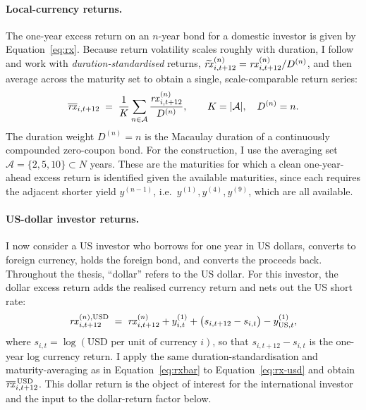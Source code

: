 \paragraph{Local-currency returns.}
The one-year excess return on an $n$-year bond for a domestic investor is given
by Equation~\eqref{eq:rx}. Because return volatility scales roughly with duration, I
follow \citet{cieslak2015} and work with \emph{duration-standardised} returns,
$\widetilde{\mathit{rx}}^{(n)}_{i,t+12}=\mathit{rx}^{(n)}_{i,t+12}/D^{(n)}$, and then average
across the maturity set to obtain a single, scale-comparable return series:
\begin{equation}
  \overline{\mathit{rx}}_{i,t+12} \;=\; \frac{1}{K}\sum_{n\in\mathcal{A}}
                        \frac{\mathit{rx}^{(n)}_{i,t+12}}{D^{(n)}},
  \qquad K=|\mathcal{A}|,\quad D^{(n)}=n.
  \label{eq:rxbar}
\end{equation}
The duration weight $D^{(n)}=n$ is the Macaulay duration of a continuously
compounded zero-coupon bond. For the construction, I use the averaging set
$\mathcal{A}=\{2,5,10\}\subset N$ years. These are the maturities for which a clean
one-year-ahead excess return is identified given the available maturities, since each
requires the adjacent shorter yield $y^{(n-1)}$, i.e.\
$y^{(1)},y^{(4)},y^{(9)}$, which are all available.

\paragraph{US-dollar investor returns.}
I now consider a US investor who borrows for one year in US dollars, converts
to foreign currency, holds the foreign bond, and converts the proceeds back.
Throughout the thesis, ``dollar'' refers to the US dollar.
For this investor, the dollar excess return adds the realised currency return
and nets out the US short rate:
\begin{equation}
  \mathit{rx}^{(n),\mathrm{USD}}_{i,t+12}
    \;=\; \mathit{rx}^{(n)}_{i,t+12} + y^{(1)}_{i,t}
          + \big(s_{i,t+12}-s_{i,t}\big) - y^{(1)}_{\mathrm{US},t},
  \label{eq:rx-usd}
\end{equation}
where $s_{i,t}=\log(\text{USD per unit of currency }i)$, so that
$s_{i,t+12}-s_{i,t}$ is the one-year log currency return. I apply the same
duration-standardisation and maturity-averaging as in Equation~\eqref{eq:rxbar} to
Equation~\eqref{eq:rx-usd} and obtain $\overline{\mathit{rx}}^{\,\mathrm{USD}}_{i,t+12}$. This dollar
return is the object of interest for the international investor and the input
to the dollar-return factor below.


